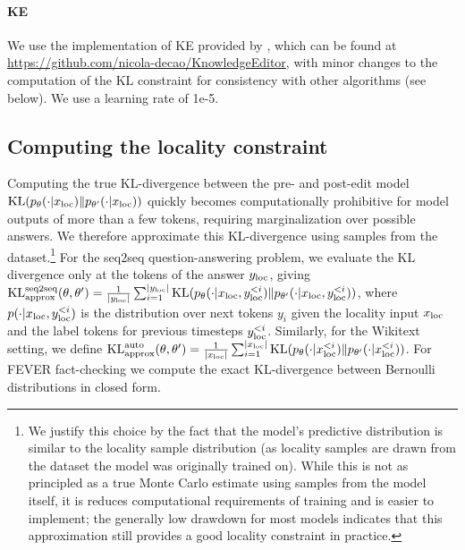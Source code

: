 \paragraph{KE} We use the implementation of KE provided by \cite{Cao2021EditingFK}, which can be found at \href{https://github.com/nicola-decao/KnowledgeEditor}{https://github.com/nicola-decao/KnowledgeEditor}, with minor changes to the computation of the KL constraint for consistency with other algorithms (see below). We use a learning rate of 1e-5.

\subsection{Computing the locality constraint}
\label{sec:locality}
Computing the true KL-divergence between the pre- and post-edit model $\text{KL}(p_\theta(\cdot | x_\text{loc}) \| p_{\theta'}(\cdot | x_\text{loc}))$ quickly becomes computationally prohibitive for model outputs of more than a few tokens, requiring marginalization over possible answers. We therefore approximate this KL-divergence using samples from the dataset.\footnote{We justify this choice by the fact that the model's predictive distribution is similar to the locality sample distribution (as locality samples are drawn from the dataset the model was originally trained on). While this is not as principled as a true Monte Carlo estimate using samples from the model itself, it is reduces computational requirements of training and is easier to implement; the generally low drawdown for most models indicates that this approximation still provides a good locality constraint in practice.} For the seq2seq question-answering problem, we evaluate the KL divergence only at the tokens of the answer $y_\text{loc}$, giving $\text{KL}_\text{approx}^\text{seq2seq}(\theta,\theta') = \frac{1}{|y_\text{loc}|}\sum_{i=1}^{|y_\text{loc}|}\text{KL}(p_\theta(\cdot | x_\text{loc}, y_\text{loc}^{<i}) \| p_{\theta'}(\cdot | x_\text{loc},y_\text{loc}^{<i}))$, where $p(\cdot | x_\text{loc}, y_\text{loc}^{<i})$ is the distribution over next tokens $y_i$ given the locality input $x_\text{loc}$ and the label tokens for previous timesteps $y_\text{loc}^{<i}$. Similarly, for the Wikitext setting, we define $\text{KL}_\text{approx}^\text{auto}(\theta,\theta') = \frac{1}{|x_\text{loc}|}\sum_{i=1}^{|x_\text{loc}|}\text{KL}(p_\theta(\cdot | x_\text{loc}^{<i}) \| p_{\theta'}(\cdot | x_\text{loc}^{<i}))$. For FEVER fact-checking we compute the exact KL-divergence between Bernoulli distributions in closed form. 

